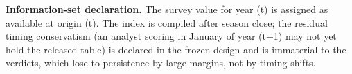 \documentclass[11pt]{article}
\begin{document}
\textbf{Information-set declaration.} The survey value for year (t) is
assigned as available at origin (t). The index is compiled after season
close; the residual timing conservatism (an analyst scoring in January
of year (t+1) may not yet hold the released table) is declared in the
frozen design and is immaterial to the verdicts, which lose to
persistence by large margins, not by timing shifts.
\end{document}

